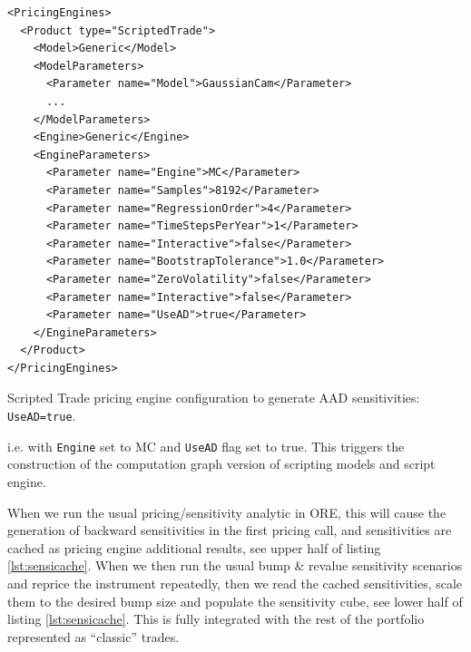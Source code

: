 \documentclass[12pt, a4paper]{report}
\begin{document}
\begin{listing}[hbt]
\begin{verbatim}
<PricingEngines>
  <Product type="ScriptedTrade">
    <Model>Generic</Model>
    <ModelParameters>
      <Parameter name="Model">GaussianCam</Parameter>
      ...
    </ModelParameters>
    <Engine>Generic</Engine>
    <EngineParameters>
      <Parameter name="Engine">MC</Parameter>
      <Parameter name="Samples">8192</Parameter>
      <Parameter name="RegressionOrder">4</Parameter>
      <Parameter name="TimeStepsPerYear">1</Parameter>
      <Parameter name="Interactive">false</Parameter>
      <Parameter name="BootstrapTolerance">1.0</Parameter>
      <Parameter name="ZeroVolatility">false</Parameter>
      <Parameter name="Interactive">false</Parameter>
      <Parameter name="UseAD">true</Parameter>
    </EngineParameters>
  </Product>
</PricingEngines>
\end{verbatim}
\caption{Scripted Trade pricing engine configuration to generate AAD sensitivities: {\tt UseAD=true}.}
\label{lst:pricingengineconfig_aad}
\end{listing}

i.e. with {\tt Engine} set to MC and {\tt UseAD} flag set to true.
This triggers the construction of the computation graph version of scripting models and script engine.

When we run the usual pricing/sensitivity analytic in ORE, this will cause the generation of
backward sensitivities in the first pricing call, and sensitivities are cached as pricing
engine additional results, see upper half of listing \ref{lst:sensicache}.
When we then run the usual bump \& revalue sensitivity scenarios and
reprice the instrument repeatedly, then we read the cached sensitivities, scale them to the
desired bump size and populate the sensitivity cube, see lower half of listing \ref{lst:sensicache}.
This is fully integrated with the rest of the portfolio represented as ``classic'' trades.
\end{document}
